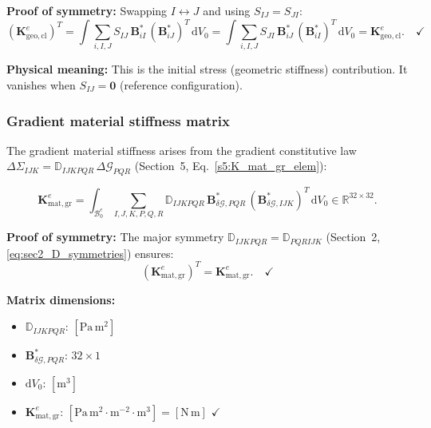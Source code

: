 \documentclass[11pt]{article}
\begin{document}
\textbf{Proof of symmetry:}
Swapping $I\leftrightarrow J$ and using $S_{IJ}=S_{JI}$:
\begin{equation}
(\mathbf{K}_{\mathrm{geo,cl}}^{e})^{T}
= \int \sum_{i,I,J} S_{IJ}\,
  \mathbf{B}_{iI}^{*}\,(\mathbf{B}_{iJ}^{*})^{T}\,\mathrm{d}V_{0}
= \int \sum_{i,I,J} S_{JI}\,
  \mathbf{B}_{iJ}^{*}\,(\mathbf{B}_{iI}^{*})^{T}\,\mathrm{d}V_{0}
= \mathbf{K}_{\mathrm{geo,cl}}^{e}. \quad\checkmark
\end{equation}

\textbf{Physical meaning:}
This is the initial stress (geometric stiffness) contribution. It
vanishes when $S_{IJ}=\mathbf{0}$ (reference configuration).

\subsubsection{Gradient material stiffness matrix}
\label{ssec:K_mat_gr}

The gradient material stiffness arises from the gradient constitutive
law $\Delta\Sigma_{IJK}=\mathbb{D}_{IJKPQR}\,\Delta\mathcal{G}_{PQR}$
(Section~5, Eq.~\eqref{s5:K_mat_gr_elem}):

\begin{equation}
\boxed{
\mathbf{K}_{\mathrm{mat,gr}}^{e}
= \int_{\mathcal{B}_{0}^{e}}
  \sum_{I,J,K,P,Q,R}
  \mathbb{D}_{IJKPQR}\,
  \mathbf{B}_{\delta\mathcal{G},PQR}^{*}\,
  (\mathbf{B}_{\delta\mathcal{G},IJK}^{*})^{T}\,
  \mathrm{d}V_{0}
\in \mathbb{R}^{32\times 32}.
}
\label{s7:K_mat_gr}
\end{equation}

\textbf{Proof of symmetry:}
The major symmetry $\mathbb{D}_{IJKPQR}=\mathbb{D}_{PQRIJK}$
(Section~2, \eqref{eq:sec2_D_symmetries}) ensures:
\begin{equation}
(\mathbf{K}_{\mathrm{mat,gr}}^{e})^{T}
= \mathbf{K}_{\mathrm{mat,gr}}^{e}. \quad\checkmark
\end{equation}

\textbf{Matrix dimensions:}
\begin{itemize}
\item $\mathbb{D}_{IJKPQR}$: $[\mathrm{Pa\,m^{2}}]$
\item $\mathbf{B}_{\delta\mathcal{G},PQR}^{*}$: $32\times 1$
\item $\mathrm{d}V_{0}$: $[\mathrm{m}^{3}]$
\item $\mathbf{K}_{\mathrm{mat,gr}}^{e}$: $[\mathrm{Pa\,m^{2}}\cdot\mathrm{m}^{-2}\cdot\mathrm{m}^{3}] = [\mathrm{N\,m}]$ $\checkmark$
\end{itemize}
\end{document}
